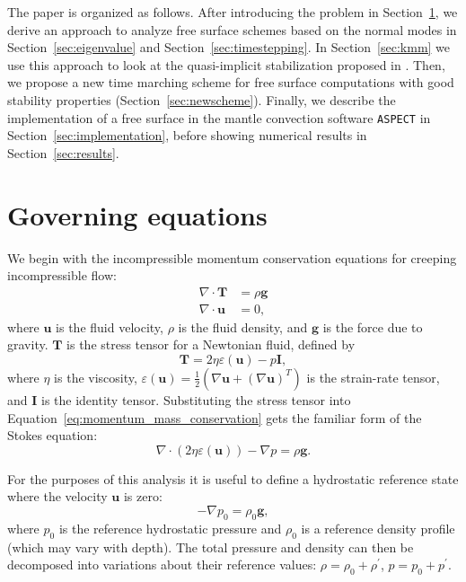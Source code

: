 \documentclass[preprint,12pt,authoryear]{elsarticle}
\begin{document}
The paper is organized as follows.
After introducing the problem in Section~\ref{sec:governing},
we derive an approach to analyze 
free surface schemes based on the normal modes in Section~\ref{sec:eigenvalue}
and Section~\ref{sec:timestepping}.
In Section~\ref{sec:kmm} we use this approach to look at the
quasi-implicit stabilization proposed in \citet{kaus2010stabilization}.
Then, we propose a new time marching scheme for free surface computations with 
good stability properties (Section~\ref{sec:newscheme}).
Finally, we describe the implementation of a free surface in the mantle convection software \texttt{ASPECT} in Section~\ref{sec:implementation}, before showing numerical results
in Section~\ref{sec:results}. 


\section{Governing equations}
\label{sec:governing}

We begin with the incompressible momentum conservation equations for creeping incompressible flow:
\begin{equation}
\begin{aligned}
\nabla \cdot \mathbf{T} &= \rho \mathbf{g} \\
\nabla \cdot \mathbf{u} &= 0,
\end{aligned}
\label{eq:momentum_mass_conservation}
\end{equation}
where $\mathbf{u}$ is the fluid velocity, $\rho$ is the fluid density, and $\mathbf{g}$ is the force due to gravity.
$\mathbf{T}$ is the stress tensor for a Newtonian fluid, defined by
\begin{equation}
\mathbf{T} = 2 \eta \varepsilon(\mathbf{u}) - p \mathbf{I},
\label{eq:stress_tensor}
\end{equation}
where $\eta$ is the viscosity, $\varepsilon(\mathbf{u}) = \frac{1}{2}(\nabla \mathbf{u} + (\nabla \mathbf{u} )^T )$
is the strain-rate tensor, and $\mathbf{I}$ is the identity tensor.
Substituting the stress tensor into Equation~\eqref{eq:momentum_mass_conservation} gets the familiar form of the Stokes equation:
\begin{equation}
\nabla \cdot \left( 2 \eta \varepsilon( \mathbf{u} ) \right) - \nabla p = \rho \mathbf{g}.
\label{eq:stokes}
\end{equation}

For the purposes of this analysis it is useful to define a hydrostatic reference state where the 
velocity $\mathbf{u}$ is zero:
\begin{equation}
- \nabla p_0 = \rho_0 \mathbf{g},
\label{eq:hydrostatic_stokes}
\end{equation}
where $p_0$ is the reference hydrostatic pressure and $\rho_0$ is a reference density profile (which may vary with depth).
The total pressure and density can then be decomposed into variations about their 
reference values: $\rho = \rho_0 + \rho^\prime$, $p = p_0 + p^\prime$. 
\end{document}
